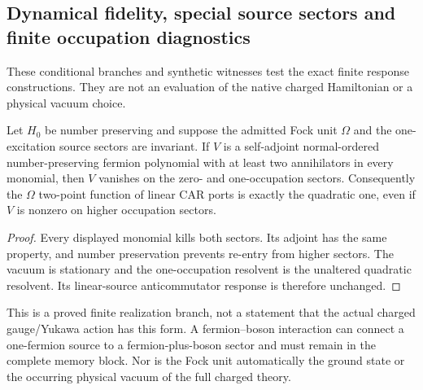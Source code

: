 \documentclass[12pt,a4paper]{article}
\begin{document}




\subsection{Dynamical fidelity, special source sectors and finite occupation diagnostics}
\label{p4:app:v2168-source-dynamics-diagnostics}
These conditional branches and synthetic witnesses test the exact finite
response constructions. They are not an evaluation of the native charged
Hamiltonian or a physical vacuum choice.
\begin{corollary}
\label{p4:cor:v2168-source-invisible-interaction}
Let $H_0$ be number preserving and suppose the admitted Fock unit $\Omega$
and the one-excitation source sectors are invariant. If $V$ is a self-adjoint
normal-ordered number-preserving fermion polynomial with at least two
annihilators in every monomial, then $V$ vanishes on the zero- and
one-occupation sectors. Consequently the $\Omega$ two-point function of
linear CAR ports is exactly the quadratic one, even if $V$ is nonzero on
higher occupation sectors.
\end{corollary}
\begin{proof}
Every displayed monomial kills both sectors. Its adjoint has the same property,
and number preservation prevents re-entry from higher sectors. The vacuum is
stationary and the one-occupation resolvent is the unaltered quadratic
resolvent. Its linear-source anticommutator response is therefore unchanged.
\end{proof}

This is a proved finite realization branch, not a statement that the actual
charged gauge/Yukawa action has this form. A fermion--boson interaction can
connect a one-fermion source to a fermion-plus-boson sector and must remain in
the complete memory block. Nor is the Fock unit automatically the ground
state or the occurring physical vacuum of the full charged theory.
\end{document}
